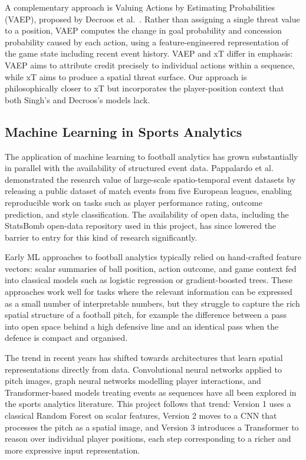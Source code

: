 \documentclass{article}
\begin{document}
A complementary approach is Valuing Actions by Estimating Probabilities (VAEP), proposed by Decroos et al.\ \cite{decroos2019}. Rather than assigning a single threat value to a position, VAEP computes the change in goal probability and concession probability caused by each action, using a feature-engineered representation of the game state including recent event history. VAEP and xT differ in emphasis: VAEP aims to attribute credit precisely to individual actions within a sequence, while xT aims to produce a spatial threat surface. Our approach is philosophically closer to xT but incorporates the player-position context that both Singh's and Decroos's models lack.

\subsection{Machine Learning in Sports Analytics}

The application of machine learning to football analytics has grown substantially in parallel with the availability of structured event data. Pappalardo et al.\ \cite{pappalardo2019} demonstrated the research value of large-scale spatio-temporal event datasets by releasing a public dataset of match events from five European leagues, enabling reproducible work on tasks such as player performance rating, outcome prediction, and style classification. The availability of open data, including the StatsBomb open-data repository used in this project, has since lowered the barrier to entry for this kind of research significantly.

Early ML approaches to football analytics typically relied on hand-crafted feature vectors: scalar summaries of ball position, action outcome, and game context fed into classical models such as logistic regression or gradient-boosted trees. These approaches work well for tasks where the relevant information can be expressed as a small number of interpretable numbers, but they struggle to capture the rich spatial structure of a football pitch, for example the difference between a pass into open space behind a high defensive line and an identical pass when the defence is compact and organised.

The trend in recent years has shifted towards architectures that learn spatial representations directly from data. Convolutional neural networks applied to pitch images, graph neural networks modelling player interactions, and Transformer-based models treating events as sequences have all been explored in the sports analytics literature. This project follows that trend: Version 1 uses a classical Random Forest on scalar features, Version 2 moves to a CNN that processes the pitch as a spatial image, and Version 3 introduces a Transformer to reason over individual player positions, each step corresponding to a richer and more expressive input representation.
\end{document}
